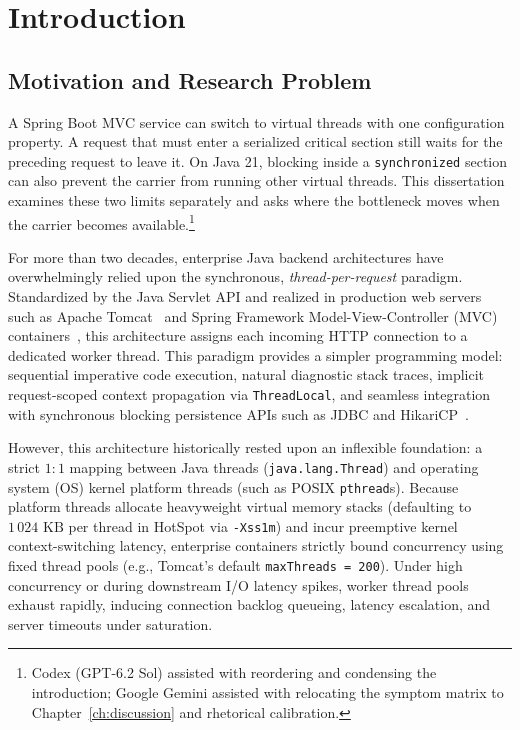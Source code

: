 \chapter{Introduction}
\label{ch:introduction}

\section{Motivation and Research Problem}
\label{sec:motivation-problem}

A Spring Boot MVC service can switch to virtual threads with one configuration property. A request that must enter a serialized critical section still waits for the preceding request to leave it. On Java 21, blocking inside a \texttt{synchronized} section can also prevent the carrier from running other virtual threads. This dissertation examines these two limits separately and asks where the bottleneck moves when the carrier becomes available.\footnote{Codex (GPT-6.2 Sol) assisted with reordering and condensing the introduction; Google Gemini assisted with relocating the symptom matrix to Chapter~\ref{ch:discussion} and rhetorical calibration.}

For more than two decades, enterprise Java backend architectures have overwhelmingly relied upon the synchronous, \emph{thread-per-request} paradigm. Standardized by the Java Servlet API and realized in production web servers such as Apache Tomcat~\cite{TomcatReference} and Spring Framework Model-View-Controller (MVC) containers~\cite{SpringReference}, this architecture assigns each incoming HTTP connection to a dedicated worker thread. This paradigm provides a simpler programming model: sequential imperative code execution, natural diagnostic stack traces, implicit request-scoped context propagation via \texttt{ThreadLocal}, and seamless integration with synchronous blocking persistence APIs such as JDBC and HikariCP~\cite{HikariCPReference}.

However, this architecture historically rested upon an inflexible foundation: a strict $1:1$ mapping between Java threads (\texttt{java.lang.Thread}) and operating system (OS) kernel platform threads (such as POSIX \texttt{pthread}s). Because platform threads allocate heavyweight virtual memory stacks (defaulting to $1\,024\text{ KB}$ per thread in HotSpot via \texttt{-Xss1m}) and incur preemptive kernel context-switching latency, enterprise containers strictly bound concurrency using fixed thread pools (e.g., Tomcat's default \texttt{maxThreads = 200}). Under high concurrency or during downstream I/O latency spikes, worker thread pools exhaust rapidly, inducing connection backlog queueing, latency escalation, and server timeouts under saturation.

